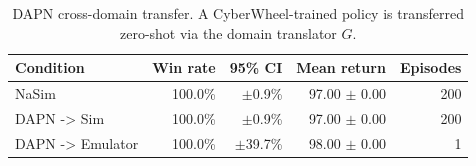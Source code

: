 \begin{table}[t]
\centering
\caption{DAPN cross-domain transfer. A CyberWheel-trained policy is transferred zero-shot via the domain translator $G$.}
\label{tab:dapn-transfer}
\begin{tabular}{lrrrr}
\toprule
Condition & Win rate & 95\% CI & Mean return & Episodes \\
\midrule
NaSim & 100.0\% & $\pm$0.9\% & 97.00 $\pm$ 0.00 & 200 \\
DAPN -> Sim & 100.0\% & $\pm$0.9\% & 97.00 $\pm$ 0.00 & 200 \\
DAPN -> Emulator & 100.0\% & $\pm$39.7\% & 98.00 $\pm$ 0.00 & 1 \\
\bottomrule
\end{tabular}
\end{table}
